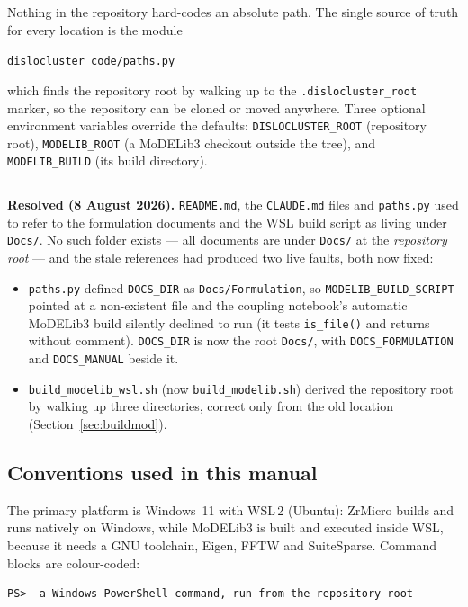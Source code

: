 \documentclass[11pt]{article}
\newcommand{\ZrM}{\textsf{ZrMicro}}
\newcommand{\MoD}{\textsf{MoDELib3}}
\newcommand{\code}[1]{\texttt{\small #1}}
\newcommand{\file}[1]{\texttt{\footnotesize #1}}
\newenvironment{notebox}
  {\par\medskip\noindent
   \begin{minipage}{\textwidth}
   {\color{blue!50!black}\rule{\textwidth}{0.8pt}}\par\smallskip
   \small\noindent{\color{blue!50!black}\textbf{Note.}}\space}
  {\par\smallskip\noindent{\color{blue!50!black}\rule{\textwidth}{0.8pt}}
   \end{minipage}\par\medskip}
\begin{document}
Nothing in the repository hard-codes an absolute path. The single source of
truth for every location is the module
\begin{center}
\file{dislocluster\_code/paths.py}
\end{center}
which finds the repository root by walking up to the
\file{.dislocluster\_root} marker, so the repository can be cloned or moved
anywhere. Three optional environment variables override the defaults:
\code{DISLOCLUSTER\_ROOT} (repository root), \code{MODELIB\_ROOT} (a \MoD{}
checkout outside the tree), and \code{MODELIB\_BUILD} (its build directory).

\begin{notebox}
\textbf{Resolved (8 August 2026).} \file{README.md}, the \file{CLAUDE.md}
files and \file{paths.py} used to refer to the formulation documents and the
WSL build script as living under \file{Docs/}. No such
folder exists --- all documents are under \file{Docs/} at the
\emph{repository root} --- and the stale references had produced two live
faults, both now fixed:
\begin{itemize}
  \item \file{paths.py} defined \code{DOCS\_DIR} as
        \file{Docs/Formulation}, so
        \code{MODELIB\_BUILD\_SCRIPT} pointed at a non-existent file and the
        coupling notebook's automatic \MoD{} build silently declined to run
        (it tests \code{is\_file()} and returns without comment).
        \code{DOCS\_DIR} is now the root \file{Docs/}, with
        \code{DOCS\_FORMULATION} and \code{DOCS\_MANUAL} beside it.
  \item \file{build\_modelib\_wsl.sh} (now \file{build\_modelib.sh}) derived the repository root by walking
        up three directories, correct only from the old location
        (Section~\ref{sec:buildmod}).
\end{itemize}
\end{notebox}

\subsection{Conventions used in this manual}

The primary platform is Windows~11 with WSL\,2 (Ubuntu): \ZrM{} builds and
runs natively on Windows, while \MoD{} is built and executed inside WSL,
because it needs a GNU toolchain, Eigen, FFTW and SuiteSparse. Command blocks
are colour-coded:

\begin{lstlisting}[style=ps]
PS>  a Windows PowerShell command, run from the repository root
\end{lstlisting}
\end{document}
